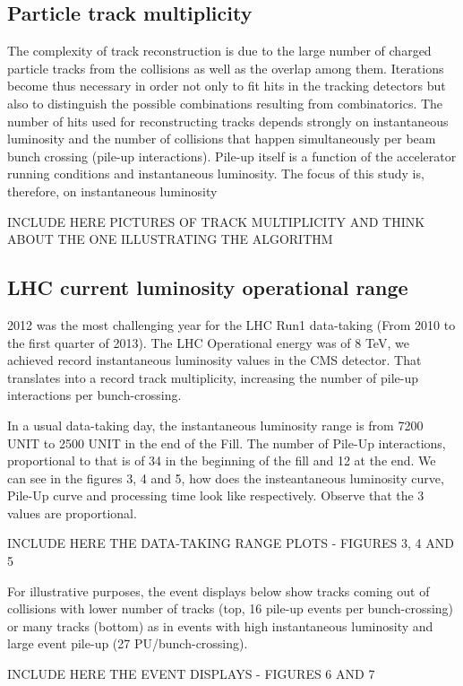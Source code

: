 \documentclass[a4paper]{jpconf}
\begin{document}
\subsection{Particle track multiplicity}
The complexity of track reconstruction is due to the large number of charged particle tracks from the collisions as well as the  overlap among them. Iterations become thus necessary in order  not only to fit hits in the tracking detectors but also to distinguish the possible combinations resulting from combinatorics. The number of hits used for reconstructing tracks depends strongly on instantaneous luminosity and the number of collisions that happen simultaneously per beam bunch crossing (pile-up interactions). Pile-up itself is a function of the accelerator running conditions and instantaneous luminosity. The focus of this study is, therefore, on instantaneous luminosity

INCLUDE HERE PICTURES OF TRACK MULTIPLICITY AND THINK ABOUT THE ONE ILLUSTRATING THE ALGORITHM

\subsection{LHC current luminosity operational range}

2012 was the most challenging year for the LHC Run1 data-taking (From 2010 to the first quarter of 2013). The LHC Operational energy was of 8 TeV, we achieved record instantaneous luminosity values in the CMS detector. That translates into a record track multiplicity, increasing the number of pile-up interactions per bunch-crossing.

In a usual data-taking day, the instantaneous luminosity range is from 7200 UNIT to 2500 UNIT in the end of the Fill. The number of Pile-Up interactions, proportional to that is of 34 in the beginning of the fill and 12 at the end. We can see in the figures 3, 4 and 5, how does the insteantaneous luminosity curve, Pile-Up curve and processing time look like respectively. Observe that the 3 values are proportional.

INCLUDE HERE THE DATA-TAKING RANGE PLOTS - FIGURES 3, 4 AND 5

For illustrative purposes, the event displays below show tracks coming out of collisions with lower number of tracks (top, 16 pile-up events per bunch-crossing) or many tracks (bottom) as in events with high instantaneous luminosity and large event pile-up (27 
PU/bunch-crossing).

INCLUDE HERE THE EVENT DISPLAYS - FIGURES 6 AND 7
\end{document}
